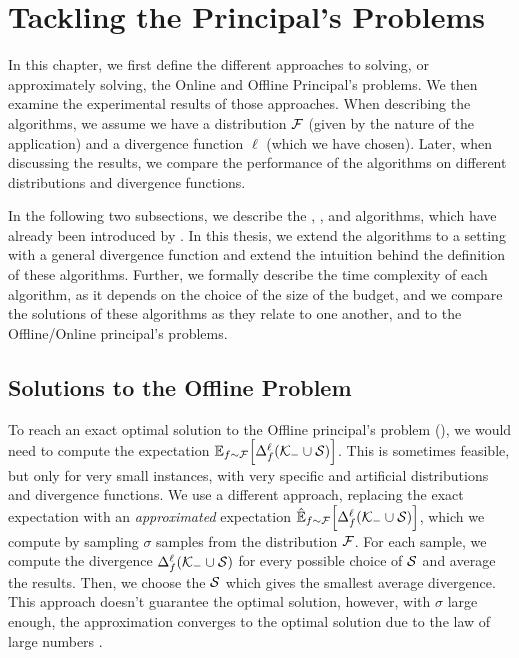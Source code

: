 \chapter{Tackling the Principal's Problems}
\label{chap:pp}

In this chapter, we first define the different approaches to solving, or approximately solving, the Online and Offline Principal's problems.
We then examine the experimental results of those approaches.
When describing the algorithms, we assume we have a distribution $ \mathcal{F} $ (given by the nature of the application) and a divergence function $ \ell $ (which we have chosen).
Later, when discussing the results, we compare the performance of the algorithms on different distributions and divergence functions.

In the following two subsections, we describe the \algFO{}, \algFG{}, \algRO{} and \algRG{} algorithms, which have already been introduced by \cite{uradnik2024reducing}.
In this thesis, we extend the algorithms to a setting with a general divergence function and extend the intuition behind the definition of these algorithms.
Further, we formally describe the time complexity of each algorithm, as it depends on the choice of the size of the budget, and we compare the solutions of these algorithms as they relate to one another, and to the Offline/Online principal's problems.

\section{Solutions to the Offline Problem}

To reach an exact optimal solution to the Offline principal's problem (), we would need to compute the expectation $ \operatorname*{\mathbb{E}}_{f \sim \mathcal{F}}\!\left[ \Delta_{f}^{\ell}\!\left(\mathcal{K}_- \cup \mathcal{S}\right) \right] $.
This is sometimes feasible, but only for very small instances, with very specific and artificial distributions and divergence functions.
We use a different approach, replacing the exact expectation with an \emph{approximated} expectation $ \operatorname*{\hat{\mathbb{E}}}_{f \sim \mathcal{F}}\!\left[ \Delta_{f}^{\ell}\!\left(\mathcal{K}_- \cup \mathcal{S}\right) \right] $, which we compute by sampling $ \sigma $ samples from the distribution $ \mathcal{F} $.
For each sample, we compute the divergence $ \Delta_{f}^{\ell}\!\left(\mathcal{K}_- \cup \mathcal{S}\right) $ for every possible choice of $ \mathcal{S} $ and average the results.
Then, we choose the $ \mathcal{S} $ which gives the smallest average divergence.
This approach doesn't guarantee the optimal solution, however, with $ \sigma $ large enough, the approximation converges to the optimal solution due to the law of large numbers \citep{Bernoulli1713}.


